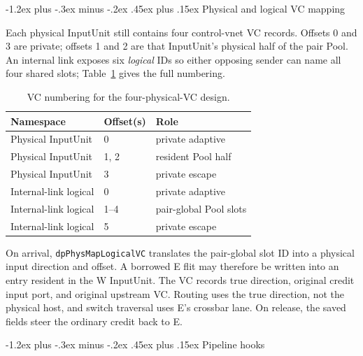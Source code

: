 \documentclass[10pt,twocolumn]{article}
\makeatletter
\renewcommand\subsection{\@startsection{subsection}{2}{\z@}%
  {-1.2ex plus -.3ex minus -.2ex}%
  {.45ex plus .15ex}%
  {\normalfont\normalsize\bfseries}}
\makeatother
\begin{document}
\subsection{Physical and logical VC mapping}
\label{sec:vc-map}

Each physical InputUnit still contains four control-vnet VC records. Offsets
0 and 3 are private; offsets 1 and 2 are that InputUnit's physical half of the
pair Pool. An internal link exposes six \emph{logical} IDs so either opposing
sender can name all four shared slots; Table~\ref{tab:vc-map} gives the full
numbering.
\begin{table}[t]
\centering
\caption{VC numbering for the four-physical-VC design.}
\label{tab:vc-map}
\small
\begin{tabular}{lll}
\toprule
Namespace & Offset(s) & Role\\
\midrule
Physical InputUnit & 0 & private adaptive\\
Physical InputUnit & 1, 2 & resident Pool half\\
Physical InputUnit & 3 & private escape\\
\midrule
Internal-link logical & 0 & private adaptive\\
Internal-link logical & 1--4 & pair-global Pool slots\\
Internal-link logical & 5 & private escape\\
\bottomrule
\end{tabular}
\end{table}

On arrival, \texttt{dpPhysMapLogicalVC} translates the pair-global slot ID
into a physical input direction and offset. A borrowed E flit may therefore be
written into an entry resident in the W InputUnit. The VC records true
direction, original credit input port, and original upstream VC. Routing uses
the true direction, not the physical host, and switch traversal uses E's
crossbar lane. On release, the saved fields steer the ordinary credit back to
E.

\subsection{Pipeline hooks}
\end{document}
